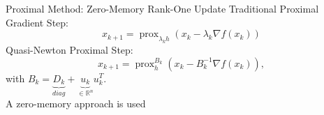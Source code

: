 \documentclass[10pt]{beamer}
\DeclareMathOperator{\prox}{prox}
\begin{document}
   \begin{frame}{Proximal Method: Zero-Memory Rank-One Update}
   	\alert{Traditional Proximal Gradient Step:}
   	\begin{equation*}
   	x_{k+1} = \prox_{\lambda_kh}(x_k - \lambda_k\nabla f(x_k))
   	\end{equation*}
   	\alert{Quasi-Newton Proximal Step:}
   	\begin{equation*}
   	x_{k+1} = \prox_h^{B_k}(x_k - B_k^{-1}\nabla f(x_k)),
   	\end{equation*}
   	with $B_k = \underbrace{D_k}_{diag} + \underbrace{u_k}_{\in\mathbb{R}^n}u_k^T$.\\
   	\vspace{5pt}
   	A zero-memory approach is used
   \end{frame}
   
\end{document}
